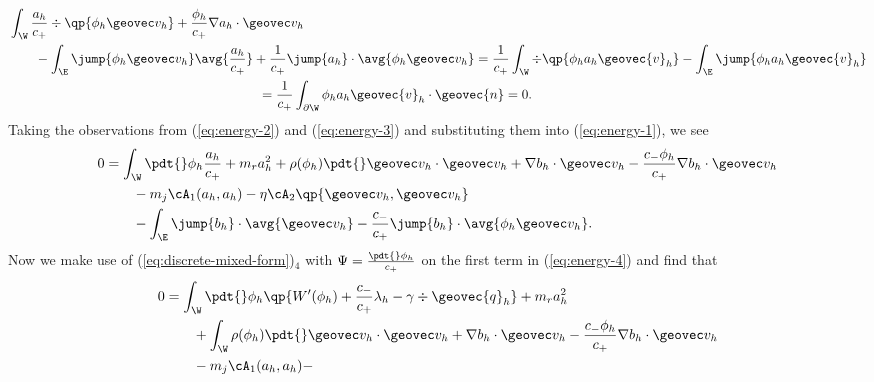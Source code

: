 \documentclass[final]{amsart}
\numberwithin{equation}{section}
\begin{document}
\begin{Proof}
\begin{equation}
\begin{split}
      &\int_\W
      \frac{a_h}{c_+} \div\qp{\phi_h\geovec v_h}
      +
      \frac{\phi_h}{c_+}\nabla a_h \cdot \geovec v_h
      \\
      &\qquad -
      \int_\E \jump{\phi_h \geovec v_h}\avg{\frac{a_h}{c_+}}
      +
      \frac{1}{c_+}\jump{ a_h} \cdot \avg{\phi_h \geovec v_h}
      =
      \frac{1}{c_+}
      \int_\W
      \div\qp{\phi_h a_h {\geovec{v}}_h} 
      -
      \int_\E
      \jump{\phi_h a_h {\geovec{v}}_h}
      \\
      &\qquad\qquad\qquad\qquad\qquad\qquad\qquad\qquad\qquad\quad=
      \frac{1}{c_+} \int_{\partial\W} \phi_h a_h {\geovec{v}}_h \cdot {\geovec{n}} = 0.
    \end{split}
  \end{equation}
  Taking the observations from (\ref{eq:energy-2}) and
  (\ref{eq:energy-3}) and substituting them into (\ref{eq:energy-1}), we see
  \begin{equation}
    \label{eq:energy-4}
    \begin{split}
      0 &= 
      \int_\W \pdt{}\phi_h  \frac{a_h}{c_+}  + m_r a_h^2
      +
      \rho(\phi_h) \pdt{}\geovec v_h \cdot \geovec v_h
      +
      \nabla b_h \cdot \geovec v_h
      -
      \frac{c_- \phi_h}{c_+}\nabla b_h \cdot \geovec v_h
      \\
      &\qquad 
      - 
      m_j \cA_1(a_h,a_h) 
      -
      \eta\cA_2\qp{{\geovec v_h},{\geovec v_h}}
      \\
      &\qquad
      -
      \int_\E
      \jump{b_h} \cdot \avg{\geovec v_h}
      -
      \frac{c_-}{c_+}\jump{b_h} \cdot \avg{\phi_h \geovec v_h}.
    \end{split}
  \end{equation}
  Now we make use of (\ref{eq:discrete-mixed-form})$_4$ with $\Psi =
  \frac{\pdt{} \phi_h}{c_+}$ on the first term in (\ref{eq:energy-4}) and find
  that
  \begin{equation}
    \label{eq:energy-5}
    \begin{split}
      0
      &= 
      \int_\W \pdt{}\phi_h 
      \qp{ W'(\phi_h) 
        +
        \frac{c_-}{c_+} \lambda_h 
        -
        \gamma \div{{\geovec{q}}_h}
      }
      +
      m_r a_h^2
      \\
      &\qquad 
      +
      \int_\W
      \rho(\phi_h) \pdt{}\geovec v_h \cdot \geovec v_h
      +
      \nabla b_h \cdot \geovec v_h
      -
      \frac{c_- \phi_h}{c_+}\nabla b_h \cdot \geovec v_h
      \\
      &\qquad 
      - 
      m_j \cA_1(a_h,a_h) 
      -

\end{split}
\end{equation}
\end{Proof}
\end{document}
